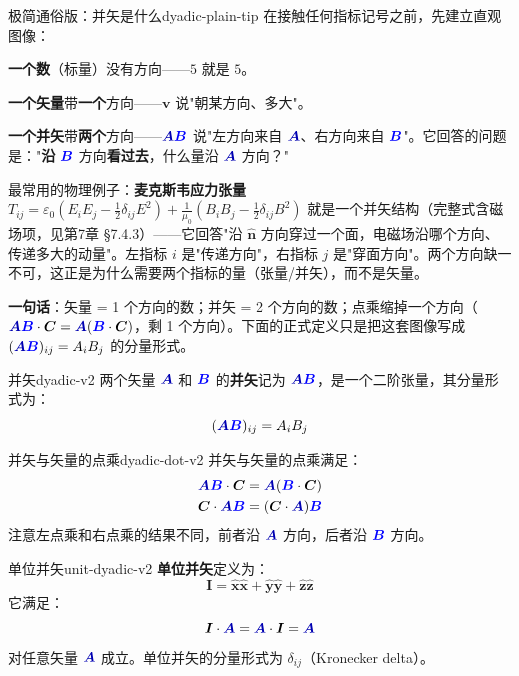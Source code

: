 \documentclass[11pt,a4paper,openany,oneside]{book}
\newcommand{\vecB}{\textcolor{blue}{\vect{B}}}
\newcommand{\vecA}{\textcolor{blue!70!black}{\vect{A}}}
\newcommand{\eps}{\varepsilon}
\newcommand{\muz}{\mu_0}
\newcommand{\vect}[1]{\bm{#1}}
\newcommand{\unitvec}[1]{\hat{\vect{#1}}}
\begin{document}
\begin{tip}{极简通俗版：并矢是什么}{dyadic-plain-tip}
在接触任何指标记号之前，先建立直观图像：

\textbf{一个数}（标量）没有方向——$5$ 就是 $5$。

\textbf{一个矢量}带\textbf{一个}方向——$\vect{v}$ 说"朝某方向、多大"。

\textbf{一个并矢}带\textbf{两个}方向——$\vecA\vecB$ 说"左方向来自 $\vecA$、右方向来自 $\vecB$"。它回答的问题是："\textbf{沿} $\vecB$ 方向\textbf{看过去}，什么量沿 $\vecA$ 方向？"

最常用的物理例子：\textbf{麦克斯韦应力张量} $T_{ij} = \eps_0(E_iE_j - \frac{1}{2}\delta_{ij}E^2) + \frac{1}{\muz}(B_iB_j - \frac{1}{2}\delta_{ij}B^2)$ 就是一个并矢结构（完整式含磁场项，见第7章 §7.4.3）——它回答"沿 $\unitvec{n}$ 方向穿过一个面，电磁场沿哪个方向、传递多大的动量"。左指标 $i$ 是"传递方向"，右指标 $j$ 是"穿面方向"。两个方向缺一不可，这正是为什么需要两个指标的量（张量/并矢），而不是矢量。

\textbf{一句话}：矢量 = 1 个方向的数；并矢 = 2 个方向的数；点乘缩掉一个方向（$\vecA\vecB\cdot\vect{C} = \vecA(\vecB\cdot\vect{C})$，剩 1 个方向）。下面的正式定义只是把这套图像写成 $(\vecA\vecB)_{ij} = A_iB_j$ 的分量形式。
\end{tip}

\begin{definition}{并矢}{dyadic-v2}
两个矢量 $\vecA$ 和 $\vecB$ 的\textbf{并矢}记为 $\vecA\vecB$，是一个二阶张量，其分量形式为：
\[
(\vecA\vecB)_{ij} = A_i B_j
\]
\end{definition}

\begin{theorem}{并矢与矢量的点乘}{dyadic-dot-v2}
并矢与矢量的点乘满足：
\begin{align*}
\vecA\vecB \cdot \vect{C} &= \vecA(\vecB \cdot \vect{C}) \\
\vect{C} \cdot \vecA\vecB &= (\vect{C} \cdot \vecA)\vecB
\end{align*}
注意左点乘和右点乘的结果不同，前者沿 $\vecA$ 方向，后者沿 $\vecB$ 方向。
\end{theorem}

\begin{definition}{单位并矢}{unit-dyadic-v2}
\textbf{单位并矢}定义为：
\[
\bm{I} = \unitvec{x}\unitvec{x} + \unitvec{y}\unitvec{y} + \unitvec{z}\unitvec{z}
\]
它满足：
\[
\bm{I} \cdot \vecA = \vecA \cdot \bm{I} = \vecA
\]
对任意矢量 $\vecA$ 成立。单位并矢的分量形式为 $\delta_{ij}$（Kronecker delta）。
\end{definition}
\end{document}
